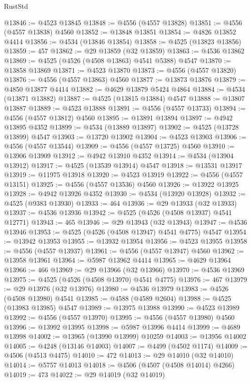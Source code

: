 \begin{lexlean}{RustStd}
\begin{coremodule}
{\begin{coremodule}
{{{{{{{{{{{{{{{{{{{{{{{{{{{{{{{{{{{{{{{{{{{{{{{{{{{{{{{@13846 := @4523 @13845
@13848 := @4556 (@4557 @13828)
@13851 := @4556 (@4557 @13838) @4560
@13852 := @13848 @13851
@13854 := @4826 @13852 @4414
@13856 := @4534 (@13846 @13854)
@13858 := @4525 (@13823 @13856)
@13859 := 457
@13862 := @29 @13859 (@32 @13859)
@13863 := @4536 @13862
@13869 := @4525 (@4526 (@4508 @13863) @4541 @5388) @4547
@13870 := @13858 @13869
@13871 := @4523 @13870
@13873 := @4556 (@4557 @13820)
@13876 := @4556 (@4557 @13863) @4560
@13877 := @13873 @13876
@13879 := @4850 @13877 @4414
@13882 := @4629 @13879 @5424 @4864
@13884 := @4534 (@13871 @13882)
@13887 := @4525 (@13815 @13884) @4547
@13888 := @13807 @13887
@13889 := @4523 @13888
@13891 := @4556 (@4557 @13733)
@13894 := @4556 (@4557 @13812) @4560
@13895 := @13891 @13894
@13897 := @4942 @13895 @4352
@13899 := @4534 (@13889 @13897)
@13902 := @4525 (@13728 @13899) @4547
@13903 := @13720 @13902
@13904 := @4523 @13903
@13906 := @4556 (@4557 @13544)
@13909 := @4556 (@4557 @13725) @4560
@13910 := @13906 @13909
@13912 := @4942 @13910 @4352
@13914 := @4534 (@13904 @13912)
@13917 := @4525 (@13539 @13914) @4547
@13918 := @13531 @13917
@13919 := @11975 @13918
@13920 := @4523 @13919
@13922 := @4556 (@4557 @13151)
@13925 := @4556 (@4557 @13536) @4560
@13926 := @13922 @13925
@13928 := @4942 @13926 @4352
@13930 := @4534 (@13920 @13928)
@13932 := @4525 (@9383 @13930)
@13933 := 464
@13936 := @29 @13933 (@32 @13933)
@13937 := @4536 @13936
@13942 := @4525 (@4526 (@4508 @13937) @4541 @12771)
@13943 := 465
@13946 := @29 @13943 (@32 @13943)
@13947 := @4536 @13946
@13953 := @4525 (@4526 (@4508 @13947) @4541 @4775) @4547
@13954 := @13942 @13953
@13955 := @13932 @13954
@13956 := @4523 @13955
@13958 := @4556 (@4557 @13937)
@13961 := @4556 (@4557 @13947) @4560
@13962 := @13958 @13961
@13964 := @5987 @13962 @4414
@13965 := @4629 @13964
@13966 := 466
@13969 := @29 @13966 (@32 @13966)
@13970 := @4536 @13969
@13975 := @4525 (@4526 (@4508 @13970) @4541 @4775)
@13976 := 467
@13979 := @29 @13976 (@32 @13976)
@13980 := @4536 @13979
@13983 := @4526 (@4508 @13980) @4541
@13985 := @4588 (@4589 @2604)
@13988 := @4525 (@13983 @13985) @4547
@13989 := @13975 @13988
@13990 := @4523 @13989
@13992 := @4556 (@4557 @13970)
@13995 := @4556 (@4557 @13980) @4560
@13996 := @13992 @13995
@13998 := @5987 @13996 @4414
@13999 := @4689 @13998
@14002 := @13965 (@13990 @13999) @10259
@14003 := @13956 @14002
@14005 := @4248 (@13146 @14003)
@14007 := @4499 (@4502 @1174)
@14009 := @4506 (@4513 @4475)
@14010 := 472
@14013 := @29 @14010 (@32 @14010)
@14014 := @5757 @14013
@14018 := @4506 (@4507 (@4508 @14014) @4266)
@14019 := 473
@14022 := @29 @14019 (@32 @14019)
}}}}}}}}}}}}}}}}}}}}}}}}}}}}}}}}}}}}}}}}}}}}}}}}}}}}}}}
\end{coremodule}}
\end{coremodule}
\end{lexlean}
